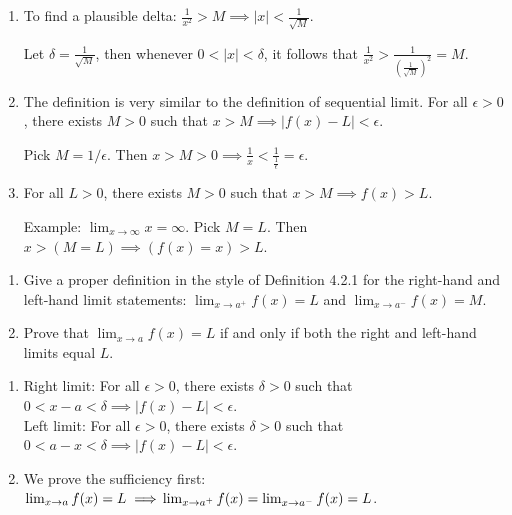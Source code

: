 \documentclass{oxmathproblems}
\begin{document}
\begin{questions}
\begin{solution}
  \begin{enumerate}[label=(\alph*)]
    \item To find a plausible delta: $\frac{1}{x^2} > M \implies |x| < \frac{1}{\sqrt{M}}$. 
    
    Let $\delta = \frac{1}{\sqrt{M}}$, then whenever $0 < |x| < \delta$, it follows that $\frac{1}{x^2} > \frac{1}{(\frac{1}{\sqrt{M}})^2} = M$.

    \item The definition is very similar to the definition of sequential limit. For all $\epsilon > 0$, there exists $M > 0$ such that $x > M \implies |f(x)-L| < \epsilon$.
    
    Pick $M = 1/\epsilon$. Then $x > M > 0 \implies \frac{1}{x} < \frac{1}{\frac{1}{\epsilon}} = \epsilon$.

    \item For all $L > 0$, there exists $M > 0$ such that $x > M \implies f(x) > L$.
    
    Example: $\lim_{x \to \infty}x = \infty$. Pick $M=L$. Then $x > (M=L) \implies (f(x)=x) > L$.
  \end{enumerate}
\end{solution}

\miquestion
\begin{enumerate}[label=(\alph*)]
  \item Give a proper definition in the style of Definition 4.2.1 for the right-hand and left-hand limit statements: $\lim_{x \to a^{+}}f(x) = L$ and
  $\lim_{x \to a^{-}}f(x) = M$.
  \item Prove that $\lim_{x \to a}f(x)=L$ if and only if both the right and left-hand limits equal $L$.
\end{enumerate}

\begin{solution}
  \begin{enumerate}[label=(\alph*)]
    \item Right limit: For all $\epsilon > 0$, there exists $\delta > 0$ such that $0 < x-a < \delta \implies |f(x)-L| < \epsilon$.\\
    Left limit: For all $\epsilon > 0$, there exists $\delta > 0$ such that $0 < a-x < \delta \implies |f(x)-L| < \epsilon$.\\
  
    \item We prove the sufficiency first: $\lim_{x \to a} f(x) = L \implies \\ \lim_{x \to a^{+}}f(x) = \lim_{x \to a^{-}}f(x) = L$.
    

\end{enumerate}
\end{solution}
\end{questions}
\end{document}
